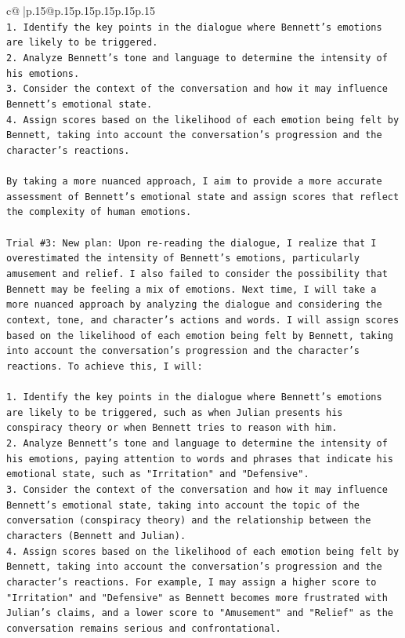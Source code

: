 \documentclass{article}
\begin{document}
{\begin{supertabular}{c@{$\;$}|p{.15\linewidth}@{}p{.15\linewidth}p{.15\linewidth}p{.15\linewidth}p{.15\linewidth}p{.15\linewidth}}
{{{\\ 
\texttt{1. Identify the key points in the dialogue where Bennett's emotions are likely to be triggered.} \\
\texttt{2. Analyze Bennett's tone and language to determine the intensity of his emotions.} \\
\texttt{3. Consider the context of the conversation and how it may influence Bennett's emotional state.} \\
\texttt{4. Assign scores based on the likelihood of each emotion being felt by Bennett, taking into account the conversation's progression and the character's reactions.} \\
\\ 
\texttt{By taking a more nuanced approach, I aim to provide a more accurate assessment of Bennett's emotional state and assign scores that reflect the complexity of human emotions.} \\
\\ 
\texttt{Trial \#3: New plan: Upon re{-}reading the dialogue, I realize that I overestimated the intensity of Bennett's emotions, particularly amusement and relief. I also failed to consider the possibility that Bennett may be feeling a mix of emotions. Next time, I will take a more nuanced approach by analyzing the dialogue and considering the context, tone, and character's actions and words. I will assign scores based on the likelihood of each emotion being felt by Bennett, taking into account the conversation's progression and the character's reactions. To achieve this, I will:} \\
\\ 
\texttt{1. Identify the key points in the dialogue where Bennett's emotions are likely to be triggered, such as when Julian presents his conspiracy theory or when Bennett tries to reason with him.} \\
\texttt{2. Analyze Bennett's tone and language to determine the intensity of his emotions, paying attention to words and phrases that indicate his emotional state, such as "Irritation" and "Defensive".} \\
\texttt{3. Consider the context of the conversation and how it may influence Bennett's emotional state, taking into account the topic of the conversation (conspiracy theory) and the relationship between the characters (Bennett and Julian).} \\
\texttt{4. Assign scores based on the likelihood of each emotion being felt by Bennett, taking into account the conversation's progression and the character's reactions. For example, I may assign a higher score to "Irritation" and "Defensive" as Bennett becomes more frustrated with Julian's claims, and a lower score to "Amusement" and "Relief" as the conversation remains serious and confrontational.} \\
}}}
\end{supertabular}}
\end{document}
